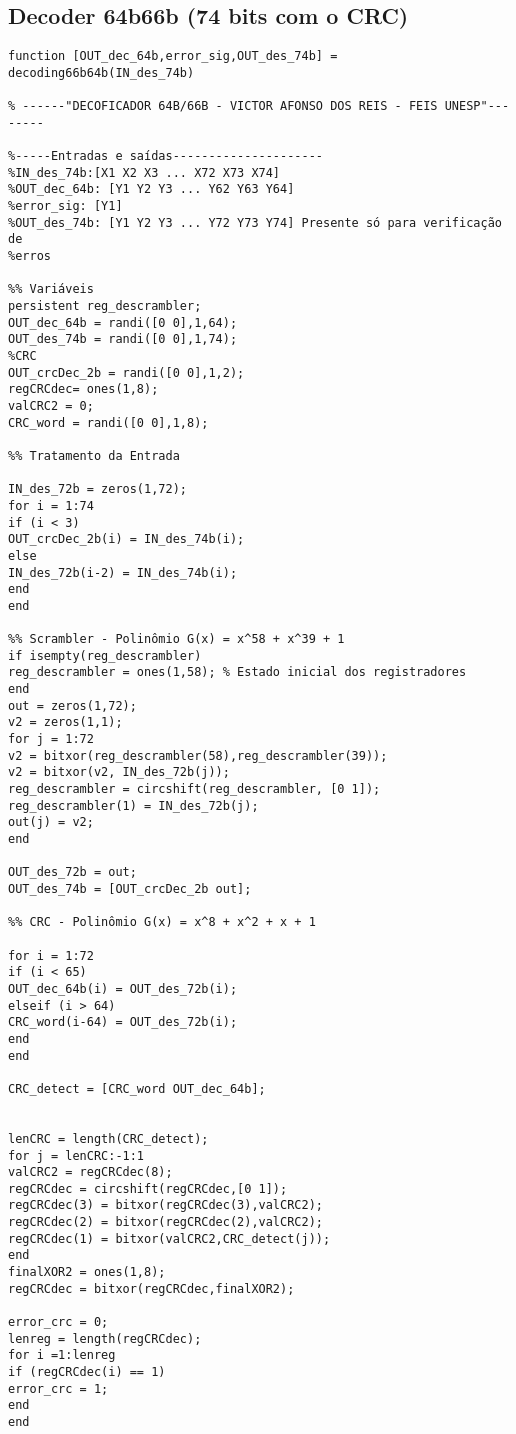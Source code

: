 \begin{apendicesenv}
\chapter{Decoder 64b66b (74 bits com o CRC)} \label{dec:64b}
\begin{lstlisting}
function [OUT_dec_64b,error_sig,OUT_des_74b] = decoding66b64b(IN_des_74b)

% ------"DECOFICADOR 64B/66B - VICTOR AFONSO DOS REIS - FEIS UNESP"--------

%-----Entradas e saídas---------------------
%IN_des_74b:[X1 X2 X3 ... X72 X73 X74]
%OUT_dec_64b: [Y1 Y2 Y3 ... Y62 Y63 Y64]
%error_sig: [Y1]
%OUT_des_74b: [Y1 Y2 Y3 ... Y72 Y73 Y74] Presente só para verificação de
%erros

%% Variáveis
persistent reg_descrambler;
OUT_dec_64b = randi([0 0],1,64);
OUT_des_74b = randi([0 0],1,74);
%CRC
OUT_crcDec_2b = randi([0 0],1,2);
regCRCdec= ones(1,8);
valCRC2 = 0;
CRC_word = randi([0 0],1,8);

%% Tratamento da Entrada

IN_des_72b = zeros(1,72);
for i = 1:74
if (i < 3)
OUT_crcDec_2b(i) = IN_des_74b(i);
else
IN_des_72b(i-2) = IN_des_74b(i);
end
end

%% Scrambler - Polinômio G(x) = x^58 + x^39 + 1
if isempty(reg_descrambler)
reg_descrambler = ones(1,58); % Estado inicial dos registradores
end
out = zeros(1,72);
v2 = zeros(1,1);
for j = 1:72
v2 = bitxor(reg_descrambler(58),reg_descrambler(39));
v2 = bitxor(v2, IN_des_72b(j));
reg_descrambler = circshift(reg_descrambler, [0 1]);
reg_descrambler(1) = IN_des_72b(j);
out(j) = v2;
end

OUT_des_72b = out;
OUT_des_74b = [OUT_crcDec_2b out];

%% CRC - Polinômio G(x) = x^8 + x^2 + x + 1

for i = 1:72
if (i < 65)
OUT_dec_64b(i) = OUT_des_72b(i);
elseif (i > 64)
CRC_word(i-64) = OUT_des_72b(i);
end
end

CRC_detect = [CRC_word OUT_dec_64b];


lenCRC = length(CRC_detect);
for j = lenCRC:-1:1
valCRC2 = regCRCdec(8);
regCRCdec = circshift(regCRCdec,[0 1]);
regCRCdec(3) = bitxor(regCRCdec(3),valCRC2);
regCRCdec(2) = bitxor(regCRCdec(2),valCRC2);
regCRCdec(1) = bitxor(valCRC2,CRC_detect(j));
end
finalXOR2 = ones(1,8);
regCRCdec = bitxor(regCRCdec,finalXOR2);

error_crc = 0;
lenreg = length(regCRCdec);
for i =1:lenreg
if (regCRCdec(i) == 1)
error_crc = 1;
end
end


\end{lstlisting}
\end{apendicesenv}

